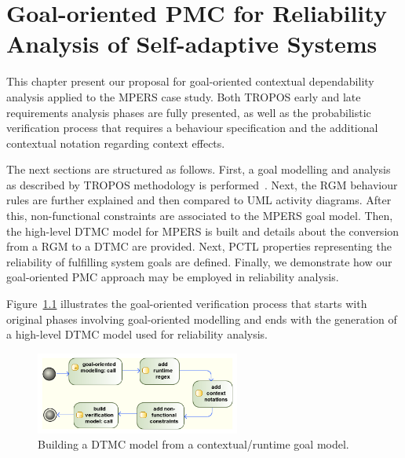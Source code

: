 \chapter{Goal-oriented PMC for Reliability Analysis of Self-adaptive Systems}\label{ch:proposal}

This chapter present our proposal for goal-oriented contextual dependability analysis applied to the MPERS case study. Both TROPOS early and late requirements analysis phases are fully presented, as well as the probabilistic verification process that requires a behaviour specification and the additional contextual notation regarding context effects. 


The next sections are structured as follows. First, a goal modelling and analysis as described by TROPOS methodology is performed~\cite{Bresciani:2004}. Next, the RGM behaviour rules are further explained and then compared to UML activity diagrams. After this, non-functional constraints are associated to the MPERS goal model. Then, the high-level DTMC model for MPERS is built and details about the conversion from a RGM to a DTMC are provided. Next, PCTL properties representing the reliability of fulfilling system goals are defined. Finally, we demonstrate how our goal-oriented PMC approach may be employed in reliability analysis. 


Figure~\ref{fig:CRGM_TO_DTMC} illustrates the goal-oriented verification process that starts with original phases involving goal-oriented modelling and ends with the generation of a high-level DTMC model used for reliability analysis.

\begin{figure}[h!]
\centering
\includegraphics[width=0.60\textwidth]{imgs/CRGM_TO_DTMC.png}
\caption{Building a DTMC model from a contextual/runtime goal model.}
\label{fig:CRGM_TO_DTMC}
\end{figure}

